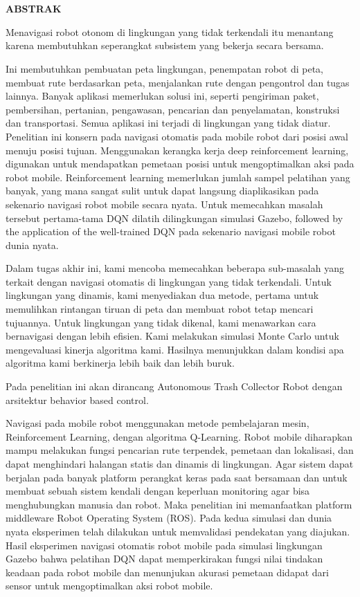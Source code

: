 \chapter*{}
\vspace*{-1.0cm}
\begin{center}
\normalfont\LARGE\textbf{ABSTRAK}
\end{center}
Menavigasi robot otonom di lingkungan yang tidak terkendali itu menantang karena membutuhkan seperangkat subsistem yang bekerja secara bersama. 

Ini membutuhkan pembuatan peta lingkungan, penempatan robot di peta, membuat rute berdasarkan peta, menjalankan rute dengan pengontrol dan tugas lainnya.  
Banyak aplikasi memerlukan solusi ini, seperti pengiriman paket, pembersihan, pertanian, pengawasan, 
pencarian dan penyelamatan, konstruksi dan transportasi. Semua aplikasi ini terjadi di lingkungan yang tidak diatur. 
Penelitian ini konsern pada navigasi otomatis pada mobile robot dari posisi awal menuju posisi tujuan. 
Menggunakan kerangka kerja deep reinforcement learning, digunakan untuk mendapatkan pemetaan posisi untuk mengoptimalkan aksi pada robot mobile. Reinforcement learning memerlukan jumlah sampel pelatihan yang banyak, yang mana sangat sulit untuk dapat langsung diaplikasikan pada sekenario navigasi robot mobile secara nyata. Untuk memecahkan masalah tersebut pertama-tama DQN dilatih dilingkungan simulasi Gazebo, followed by the application of the well-trained DQN pada sekenario navigasi mobile robot dunia nyata.


Dalam tugas akhir ini, kami mencoba memecahkan beberapa sub-masalah yang terkait dengan navigasi otomatis di lingkungan yang tidak terkendali. 
Untuk lingkungan yang dinamis, kami menyediakan dua metode, pertama untuk memulihkan rintangan tiruan di peta dan membuat robot tetap mencari tujuannya. 
Untuk lingkungan yang tidak dikenal, kami menawarkan cara bernavigasi dengan lebih efisien. Kami melakukan simulasi Monte Carlo untuk mengevaluasi kinerja algoritma kami. Hasilnya menunjukkan dalam kondisi apa algoritma kami berkinerja lebih baik dan lebih buruk.

Pada penelitian ini akan dirancang Autonomous Trash Collector Robot dengan arsitektur behavior based control. 

Navigasi pada mobile robot menggunakan metode pembelajaran mesin, Reinforcement Learning, dengan algoritma Q-Learning. Robot mobile diharapkan mampu melakukan fungsi pencarian rute terpendek, pemetaan dan lokalisasi, dan dapat menghindari halangan statis dan dinamis di lingkungan. Agar sistem dapat berjalan pada banyak platform perangkat keras pada saat bersamaan dan untuk membuat sebuah sistem kendali dengan keperluan monitoring agar bisa menghubungkan manusia dan robot. Maka penelitian ini memanfaatkan platform middleware Robot Operating System (ROS).
Pada kedua simulasi dan dunia nyata eksperimen telah dilakukan untuk memvalidasi pendekatan yang diajukan. Hasil eksperimen navigasi otomatis robot mobile pada simulasi lingkungan Gazebo bahwa pelatihan DQN dapat memperkirakan fungsi nilai tindakan keadaan pada robot mobile dan menunjukan akurasi pemetaan didapat dari sensor untuk mengoptimalkan aksi robot mobile.

